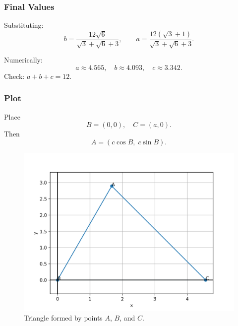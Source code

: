 \documentclass{beamer}
\begin{document}
\begin{frame}
\frametitle{Final Values}
Substituting:
\[
b = \frac{12\sqrt{6}}{\sqrt{3}+\sqrt{6}+3},\qquad
a = \frac{12(\sqrt{3}+1)}{\sqrt{3}+\sqrt{6}+3}.
\]

Numerically:
\[
a \approx 4.565,\quad b \approx 4.093,\quad c \approx 3.342.
\]
Check: \(a+b+c = 12\).
\end{frame}

\begin{frame}
\frametitle{Plot}
Place
\[
B=(0,0),\quad C=(a,0).
\]
Then
\[
A = (c\cos B,\; c\sin B).
\]
\end{frame}

\begin{figure}[h!]
    \centering
    \includegraphics[width=0.65\linewidth]{figs/fig.png}
    \caption{Triangle formed by points $A$, $B$, and $C$.}
\end{figure}
\end{document}
